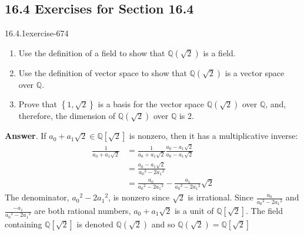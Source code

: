 \documentclass[twoside,10pt,]{book}
\numberwithin{equation}{section}
\begin{document}
\subsection*{16.4 Exercises for Section 16.4}
\begin{divisionsolution}{16.4.1}{}{exercise-674}%
\hypertarget{p-6031}{}%
\leavevmode%
\begin{enumerate}[label=(\alph*)]
\item\hypertarget{li-2666}{}\hypertarget{p-6032}{}%
Use the definition of a field to show that \(\mathbb{Q}(\sqrt{2})\) is a field.%
\item\hypertarget{li-2667}{}\hypertarget{p-6033}{}%
Use the definition of vector space to show that \(\mathbb{Q}\left(\sqrt{2}\right)\) is a vector space over \(\mathbb{Q}\).%
\item\hypertarget{li-2668}{}\hypertarget{p-6034}{}%
Prove that \(\left\{1,\sqrt{2}\right\}\) is a basis for the vector space \(\mathbb{Q}\left(\sqrt{2}\right)\) over \(\mathbb{Q}\), and, therefore, the dimension of  \(\mathbb{Q}(\sqrt{2})\) over \(\mathbb{Q}\) is 2.%
\end{enumerate}
%
\par\smallskip%
\noindent\textbf{Answer}.\quad%
\hypertarget{p-6035}{}%
If \(a_0+ a_1\sqrt{2}\in \mathbb{Q}\left[\sqrt{2}\right]\) is nonzero, then it has a multiplicative inverse:%
\begin{equation*}
\begin{split}
\frac{1}{a_0+ a_1\sqrt{2}} &=\frac{1}{a_0+ a_1\sqrt{2}}\frac{a_0- a_1\sqrt{2}}{a_0- a_1\sqrt{2}}\quad\\
& =\frac{a_0- a_1\sqrt{2}}{a_0{}^2- 2a_1{}^2}\\
& =\frac{a_0}{a_0{}^2- 2a_1{}^2}-\frac{ a_1}{a_0{}^2- 2a_1{}^2}\sqrt{2}
\end{split}
\end{equation*}
The denominator, \(a_0{}^2- 2a_1{}^2\), is nonzero since \(\sqrt{2}\) is irrational.  Since \(\frac{a_0}{a_0{}^2- 2a_1{}^2}\) and\(\frac{-a_1}{a_0{}^2-
2a_1{}^2}\) are both rational numbers, \(a_0+ a_1\sqrt{2}\) is a unit of \(\mathbb{Q}\left[\sqrt{2}\right]\).  The field containing \(\mathbb{Q}\left[\sqrt{2}\right]\) is denoted \(\mathbb{Q}\left(\sqrt{2}\right)\) and so \(\mathbb{Q}\left(\sqrt{2}\right)=\mathbb{Q}\left[\sqrt{2}\right]\)%
\end{divisionsolution}%
\end{document}
